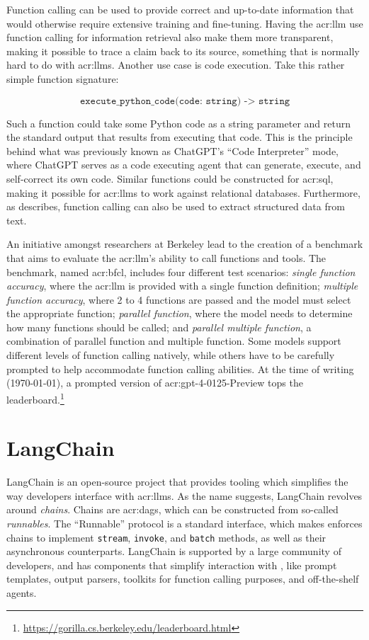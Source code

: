 Function calling can be used to provide correct and up-to-date information that would otherwise require extensive training and fine-tuning. Having the \gls{acr:llm} use function calling for information retrieval also make them more transparent, making it possible to trace a claim back to its source, something that is normally hard to do with \glspl{acr:llm}. Another use case is code execution. Take this rather simple function signature:

$$
    \texttt{execute\_python\_code(code: string) -> string}
$$

Such a function could take some Python code as a string parameter and return the standard output that results from executing that code. This is the principle behind what was previously known as ChatGPT's \enquote{Code Interpreter} mode, where ChatGPT serves as a code executing agent that can generate, execute, and self-correct its own code. Similar functions could be constructed for \acrshort{acr:sql}, making it possible for \glspl{acr:llm} to work against relational databases. Furthermore, as \cite{eletiFunctionCallingOther2023} describes, function calling can also be used to extract structured data from text.

An initiative amongst researchers at Berkeley \citep{yanfanjiaBerkeleyFunctionCalling2024} lead to the creation of a benchmark that aims to evaluate the \acrshort{acr:llm}'s ability to call functions and tools. The benchmark, named \gls{acr:bfcl}, includes four different test scenarios: \textit{single function accuracy}, where the \acrshort{acr:llm} is provided with a single function definition; \textit{multiple function accuracy}, where 2 to 4 functions are passed and the model must select the appropriate function; \textit{parallel function}, where the model needs to determine how many functions should be called; and \textit{parallel multiple function}, a combination of parallel function and multiple function. Some models support different levels of function calling natively, while others have to be carefully prompted to help accommodate function calling abilities. At the time of writing (\today), a prompted version of \acrshort{acr:gpt}-4-0125-Preview tops the leaderboard.\footnote{\url{https://gorilla.cs.berkeley.edu/leaderboard.html}}

\section{LangChain}
\label{sec:langchain}

LangChain \citep{langchainaiLangchainaiLangchain2022} is an open-source project that provides tooling which simplifies the way developers interface with \glspl{acr:llm}. As the name suggests, LangChain revolves around \textit{chains}. Chains are \glspl{acr:dag}, which can be constructed from so-called \textit{runnables}. The \enquote{Runnable} protocol is a standard interface, which makes enforces chains to implement \texttt{stream}, \texttt{invoke}, and \texttt{batch} methods, as well as their asynchronous counterparts. LangChain is supported by a large community of developers, and has components that simplify interaction with , like prompt templates, output parsers, toolkits for function calling purposes, and off-the-shelf agents.

